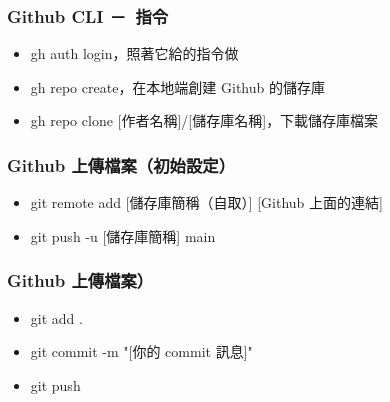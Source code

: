 \documentclass[mathserif]{beamer}
\begin{document}
\begin{frame}
    \frametitle{Github CLI －\ 指令}
    \begin{itemize}
        \item {\color{red}gh auth login}，照著它給的指令做
        \item<2-> {\color{red}gh repo create}，在本地端創建 Github 的儲存庫
        \item<3-> {\color{red}gh repo clone [作者名稱]/[儲存庫名稱]}，下載儲存庫檔案
    \end{itemize}
\end{frame}

\begin{frame}
    \frametitle{Github 上傳檔案（初始設定）}
    \begin{itemize}
        \item {\color{red}git remote add [儲存庫簡稱（自取）] [Github 上面的連結]}
        \item {\color{red}git push -u [儲存庫簡稱] main}
    \end{itemize}
\end{frame}

\begin{frame}
    \frametitle{Github 上傳檔案）}
    \begin{itemize}
        \item {\color{red}git add .}
        \item {\color{red}git commit -m "[你的 commit 訊息]"}
        \item {\color{red}git push}
    \end{itemize}
\end{frame}
\end{document}
